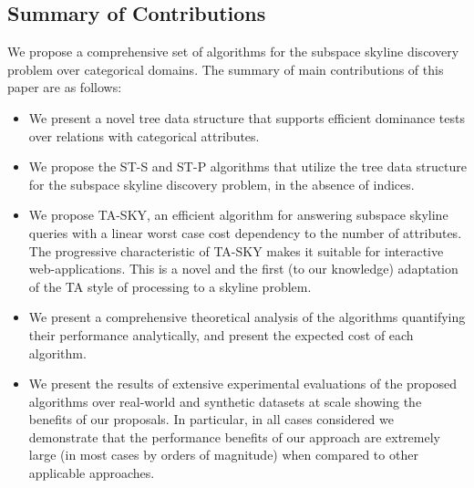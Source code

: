 \subsection{Summary of Contributions}
We propose a comprehensive set of algorithms for the subspace skyline discovery problem over categorical domains.
The summary of main contributions of this paper are as follows:
\begin{itemize}  
    \itemsep0em 
    \item We present a novel tree data structure that supports efficient dominance tests over relations with categorical attributes.
    \item We propose the ST-S and ST-P algorithms that utilize the tree data structure for the subspace skyline discovery problem, in the absence of indices.
    \item We propose TA-SKY, an efficient algorithm for answering subspace skyline queries with a linear worst case cost dependency to the number of attributes. The progressive characteristic of TA-SKY makes it suitable for interactive web-applications. This is a novel and the first (to our knowledge) adaptation of the TA style of processing to a skyline problem.
    \item We present a comprehensive theoretical analysis of the algorithms quantifying their performance analytically, and present the expected cost of each algorithm.
    \item We present the results of extensive experimental evaluations of the proposed algorithms over real-world and synthetic datasets at scale showing the benefits of our proposals. In particular, in all cases considered we demonstrate that the performance benefits of our approach are extremely large (in most cases by orders of magnitude) when compared to other applicable approaches.
\end{itemize}


